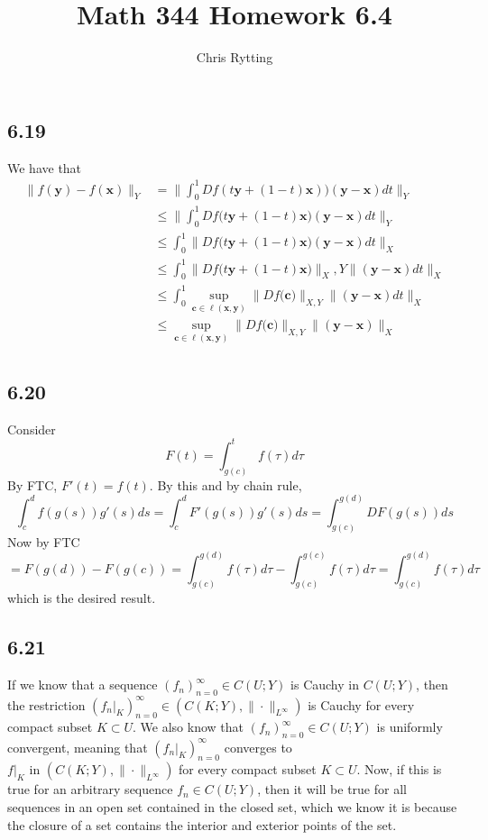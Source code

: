 \documentclass[letterpaper,12pt]{article}
\theoremstyle{definition}
\begin{document}
\title{Math 344 Homework 6.4}
\author{Chris Rytting}
\maketitle

\subsection*{6.19}
We have that 
\begin{align*}
    \|f(\textbf{y} ) - f(\textbf{x} )\|_Y &= \|\int^{1}_{0}Df(t \textbf{y}  + (1-t)\textbf{x} ))(\textbf{y} -\textbf{x} ) dt\|_Y\\
    &\leq \| \int_0^1 Df\big(t \textbf{y} + (1- t) \textbf{x} \big) ( \textbf{y} - \textbf{x}) dt\|_Y \\
    &\leq \int_0^1 \|  Df\big(t \textbf{y} + (1- t) \textbf{x} \big) ( \textbf{y} - \textbf{x}) dt\|_X \\
    &\leq \int_0^1 \|  Df\big(t \textbf{y} + (1- t) \textbf{x} \big) \|_X,Y \| ( \textbf{y} - \textbf{x})dt \|_X \\
    &\leq \int_0^1 \sup_{ \textbf{c} \in \ell( \textbf{x}, \textbf{y})} \|  Df\big( \textbf{c} \big) \|_{X,Y} \| ( \textbf{y} - \textbf{x}) dt\|_X \\
    &\leq \sup_{ \textbf{c} \in \ell( \textbf{x}, \textbf{y})} \|  Df\big( \textbf{c} \big) \|_{X,Y} \| ( \textbf{y} - \textbf{x}) \|_X \\
\end{align*}


\subsection*{6.20}
Consider
\[F(t) =  \int_{g(c)}^{t} f(\tau) d\tau\] By FTC, $F'(t) = f(t)$. 
By this and by chain rule, 
\[\int_c^d f(g(s))g'(s)ds = \int_c^d F'(g(s))g'(s)ds= \int_{g(c)}^{g(d)} DF(g(s))ds\]
Now by FTC
\[= F(g(d)) - F(g(c)) = \int_{g(c)}^{g(d)} f(\tau)d\tau - \int_{g(c)}^{g(c)} f(\tau)d\tau = \int_{g(c)}^{g(d)} f(\tau)d \tau\]
which is the desired result.

\subsection*{6.21}
If we know that a sequence $(f_n)_{n=0}^\infty \in C(U;Y)$ is Cauchy in $C(U;Y)$, then the restriction $(f_n|_K)_{n=0}^\infty \in (C(K;Y), \|\cdot \|_{L^\infty})$ is Cauchy for every compact subset $K \subset U$. We also know that $(f_n)_{n=0}^\infty \in C(U;Y)$ is uniformly convergent, meaning that $(f_n|_K)_{n=0}^\infty$ 
converges to $f|_K \text{ in }(C(K;Y), \|\cdot \|_{L^\infty})$ for every compact subset $K \subset U$.
Now, if this is true for an arbitrary sequence $f_n \in C(U;Y)$, then it will be true for all sequences in an open set contained in the closed set, which we know it is because the closure of a set contains the interior and exterior points of the set.
\end{document}
